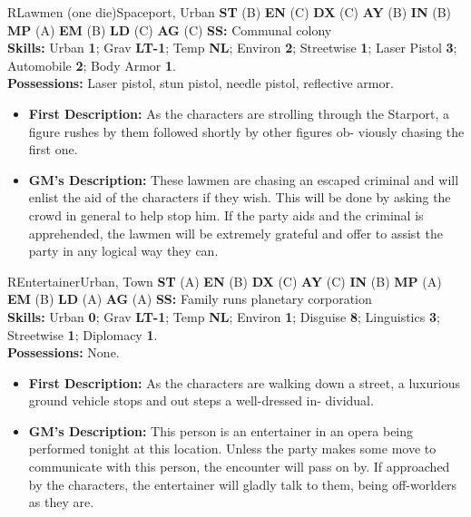 \hrulefill

\begin{npc}{R}{Lawmen (one die)}{Spaceport, Urban}
\textbf{ST} (B) \textbf{EN} (C) \textbf{DX} (C) \textbf{AY} (B) \textbf{IN} (B) \textbf{MP} (A) \textbf{EM} (B) \textbf{LD} (C) \textbf{AG} (C) \textbf{SS:} Communal colony \\
\textbf{Skills:} Urban \textbf{1}; Grav \textbf{LT-1}; Temp \textbf{NL}; Environ \textbf{2}; Streetwise \textbf{1}; Laser Pistol \textbf{3}; Automobile \textbf{2}; Body Armor \textbf{1}. \\
\textbf{Possessions:} Laser pistol, stun pistol, needle pistol, reflective armor. 
\begin{itemize}
\item\textbf{First Description:} As the characters are strolling through the Starport, a figure rushes by them followed shortly by other figures ob- 
viously chasing the first one. 
\item\textbf{GM's Description:} These lawmen are chasing an escaped criminal and will enlist the aid of the characters if they wish. This will be 
done by asking the crowd in general to help stop him. If the party aids and the criminal is apprehended, the lawmen will be extremely 
grateful and offer to assist the party in any logical way they can. 
\end{itemize}
\end{npc}

\hrulefill

\begin{npc}{R}{Entertainer}{Urban, Town}
\textbf{ST} (A) \textbf{EN} (B) \textbf{DX} (C) \textbf{AY} (C) \textbf{IN} (B) \textbf{MP} (A) \textbf{EM} (B) \textbf{LD} (A) \textbf{AG} (A) \textbf{SS:} Family runs planetary corporation \\
\textbf{Skills:} Urban \textbf{0}; Grav \textbf{LT-1}; Temp \textbf{NL}; Environ \textbf{1}; Disguise \textbf{8}; Linguistics \textbf{3}; Streetwise \textbf{1}; Diplomacy \textbf{1}. \\
\textbf{Possessions:} None. 
\begin{itemize}
\item \textbf{First Description:} As the characters are walking down a street, a luxurious ground vehicle stops and out steps a well-dressed in- 
dividual. 
\item \textbf{GM's Description:} This person is an entertainer in an opera being performed tonight at this location. Unless the party makes some 
move to communicate with this person, the encounter will pass on by. If approached by the characters, the entertainer will gladly talk to 
them, being off-worlders as they are. 
\end{itemize}
\end{npc}


